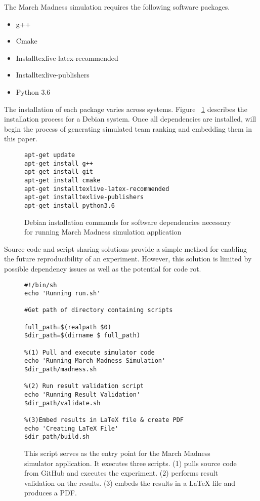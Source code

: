 \documentclass{IEEEtran}
\begin{document}
The March Madness simulation requires the following software packages.
\begin{itemize}
  \item g++
  \item Cmake
  \item Installtexlive-latex-recommended
  \item Installtexlive-publishers
  \item Python 3.6
\end{itemize}
The installation of each package varies across systems. Figure ~\ref{depend} describes the installation process for a Debian system. Once all dependencies are installed,  will begin the process of generating simulated team ranking and embedding them in this paper. 
\begin{figure}[h]
\centering
\begin{mdframed}
\small
\begin{verbatim}
apt-get update
apt-get install g++ 
apt-get install git
apt-get install cmake
apt-get installtexlive-latex-recommended
apt-get installtexlive-publishers 
apt-get install python3.6

\end{verbatim}
\end{mdframed}
\caption{\footnotesize Debian installation commands for software dependencies necessary for running March Madness simulation application}
\label{depend}
\end{figure}
Source code and script sharing solutions provide a simple method for enabling the future reproducibility of an experiment. However, this solution is limited by possible dependency issues as well as the potential for code rot.


\begin{figure}[h]
\centering
\begin{mdframed}
\small
\begin{verbatim}
#!/bin/sh
echo 'Running run.sh'

#Get path of directory containing scripts

full_path=$(realpath $0)
$dir_path=$(dirname $ full_path)

%(1) Pull and execute simulator code 
echo 'Running March Madness Simulation'
$dir_path/madness.sh

%(2) Run result validation script
echo 'Running Result Validation'
$dir_path/validate.sh

%(3)Embed results in LaTeX file & create PDF
echo 'Creating LaTeX File'
$dir_path/build.sh

\end{verbatim}
\end{mdframed}
\caption{ This script serves as the entry point for the March Madness simulator application. It executes three scripts. (1)  pulls source code from GitHub and executes the experiment. (2)  performs result validation on the results. (3)  embeds the results in a LaTeX file and produces a PDF.}
\label{run.sh}
\end{figure}
\end{document}

